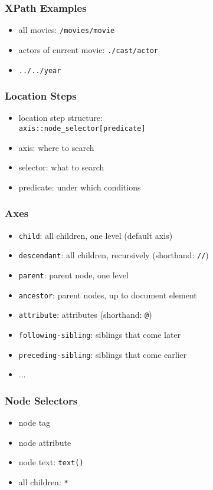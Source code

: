 \documentclass[dvipsnames]{beamer}
\theoremstyle{plain}
\begin{document}
\begin{frame}
  \frametitle{XPath Examples}

  \begin{itemize}
    \item all movies: \lstinline|/movies/movie|
    \item actors of current movie: \lstinline|./cast/actor|
    \item \lstinline|../../year|
  \end{itemize}
\end{frame}

\begin{frame}
  \frametitle{Location Steps}

  \begin{itemize}
    \item location step structure:\\
      \lstinline!axis::node_selector[predicate]!

    \medskip
    \item axis: where to search
    \item selector: what to search
    \item predicate: under which conditions
  \end{itemize}
\end{frame}

\begin{frame}
  \frametitle{Axes}

  \begin{itemize}
    \item \lstinline!child!:
      all children, one level (default axis)
    \item \lstinline!descendant!:
      all children, recursively (shorthand: \lstinline!//!)
    \item \lstinline!parent!:
      parent node, one level
    \item \lstinline!ancestor!:
      parent nodes, up to document element
    \item \lstinline!attribute!:
      attributes (shorthand: \lstinline!@!)
    \item \lstinline!following-sibling!:
      siblings that come later
    \item \lstinline!preceding-sibling!:
      siblings that come earlier
    \item ...
  \end{itemize}
\end{frame}

\begin{frame}
  \frametitle{Node Selectors}

  \begin{itemize}
    \item node tag
    \item node attribute
    \item node text: \lstinline!text()!
    \item all children: \lstinline!*!
  \end{itemize}
\end{frame}
\end{document}
